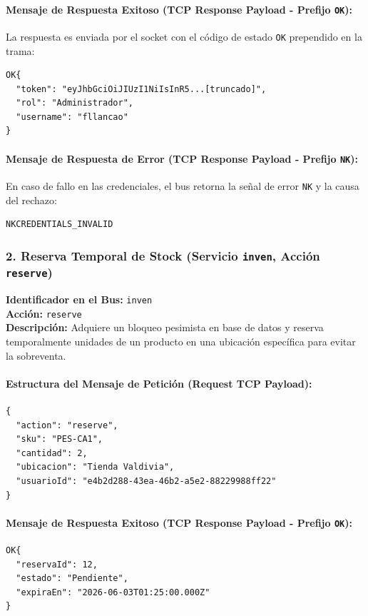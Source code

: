 \documentclass[12pt,a4paper]{article}
\begin{document}
\paragraph{Mensaje de Respuesta Exitoso (TCP Response Payload - Prefijo \texttt{OK}):}
La respuesta es enviada por el socket con el código de estado \texttt{OK} prependido en la trama:
\begin{verbatim}
OK{
  "token": "eyJhbGciOiJIUzI1NiIsInR5...[truncado]",
  "rol": "Administrador",
  "username": "fllancao"
}
\end{verbatim}

\paragraph{Mensaje de Respuesta de Error (TCP Response Payload - Prefijo \texttt{NK}):}
En caso de fallo en las credenciales, el bus retorna la señal de error \texttt{NK} y la causa del rechazo:
\begin{verbatim}
NKCREDENTIALS_INVALID
\end{verbatim}

\newpage
\subsubsection{2. Reserva Temporal de Stock (Servicio \texttt{inven}, Acción \texttt{reserve})}
\textbf{Identificador en el Bus:} \texttt{inven} \\
\textbf{Acción:} \texttt{reserve} \\
\textbf{Descripción:} Adquiere un bloqueo pesimista en base de datos y reserva temporalmente unidades de un producto en una ubicación específica para evitar la sobreventa.

\paragraph{Estructura del Mensaje de Petición (Request TCP Payload):}
\begin{verbatim}
{
  "action": "reserve",
  "sku": "PES-CA1",
  "cantidad": 2,
  "ubicacion": "Tienda Valdivia",
  "usuarioId": "e4b2d288-43ea-46b2-a5e2-88229988ff22"
}
\end{verbatim}

\paragraph{Mensaje de Respuesta Exitoso (TCP Response Payload - Prefijo \texttt{OK}):}
\begin{verbatim}
OK{
  "reservaId": 12,
  "estado": "Pendiente",
  "expiraEn": "2026-06-03T01:25:00.000Z"
}
\end{verbatim}
\end{document}
